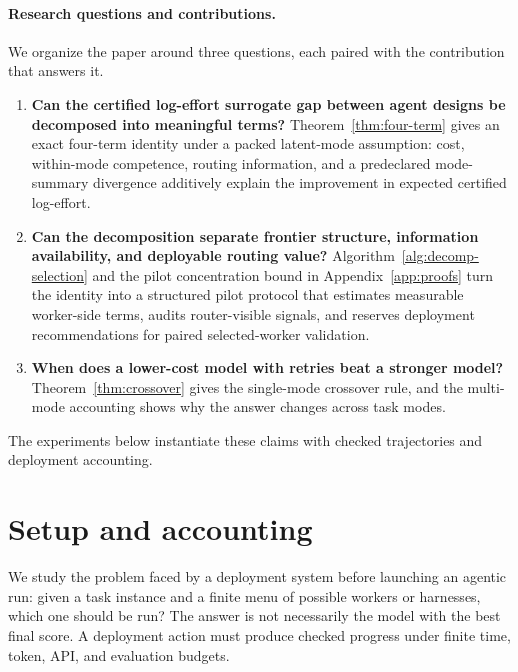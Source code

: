 \documentclass{article}
\begin{document}
\paragraph{Research questions and contributions.}
We organize the paper around three questions, each paired with the contribution that answers it.

\begin{enumerate}[leftmargin=1.4em,itemsep=0.15em]
  \item \textbf{Can the certified log-effort surrogate gap between agent designs be decomposed into meaningful terms?}
  Theorem~\ref{thm:four-term} gives an exact four-term identity under a packed latent-mode assumption: cost, within-mode competence, routing information, and a predeclared mode-summary divergence additively explain the improvement in expected certified log-effort.
  \item \textbf{Can the decomposition separate frontier structure, information availability, and deployable routing value?}
  Algorithm~\ref{alg:decomp-selection} and the pilot concentration bound in Appendix~\ref{app:proofs} turn the identity into a structured pilot protocol that estimates measurable worker-side terms, audits router-visible signals, and reserves deployment recommendations for paired selected-worker validation.
  \item \textbf{When does a lower-cost model with retries beat a stronger model?}
  Theorem~\ref{thm:crossover} gives the single-mode crossover rule, and the multi-mode accounting shows why the answer changes across task modes.
\end{enumerate}

The experiments below instantiate these claims with checked trajectories and deployment accounting.

\section{Setup and accounting}
\label{sec:framework}

We study the problem faced by a deployment system before launching an agentic run:
given a task instance and a finite menu of possible workers or harnesses, which one should be run?
The answer is not necessarily the model with the best final score.
A deployment action must produce checked progress under finite time, token, API, and evaluation budgets.
\end{document}
